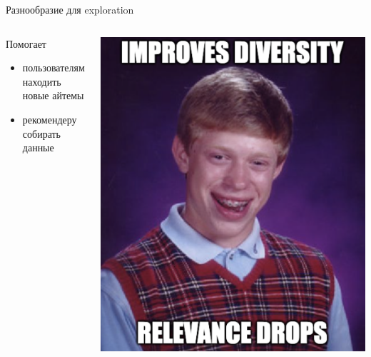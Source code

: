 \documentclass[11pt,aspectratio=169,handout]{beamer}
\begin{document}
\begin{frame}{Разнообразие для exploration}

\begin{columns}

\begin{column}{0.55\textwidth}

Помогает
\begin{itemize}
\item пользователям находить новые айтемы
\item рекомендеру собирать данные
\end{itemize}

\end{column}

\begin{column}{0.35\textwidth} 
\begin{center}
\includegraphics[scale=0.2]{images/brian.png}
\end{center}
\end{column}
\end{columns}

\end{frame}
\end{document}
